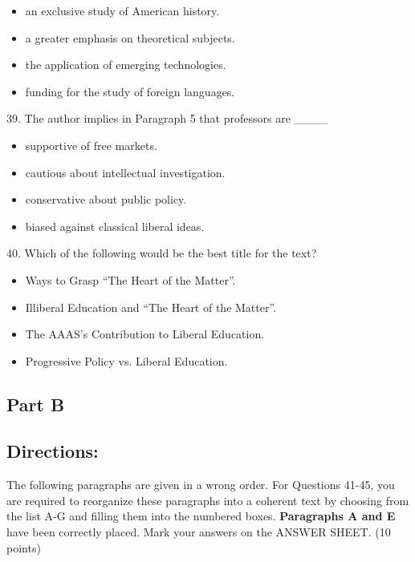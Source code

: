 \documentclass[UTF8,11pt]{ctexart}
\begin{document}
\begin{itemize}[leftmargin=2em,itemsep=.2em,topsep=.4em]\item[A.] an exclusive study of American history.
\item[B.] a greater emphasis on theoretical subjects.
\item[C.] the application of emerging technologies.
\item[D.] funding for the study of foreign languages.
\end{itemize}

39. The author implies in Paragraph 5 that professors are \_\_\_\_


\begin{itemize}[leftmargin=2em,itemsep=.2em,topsep=.4em]\item[A.] supportive of free markets.
\item[B.] cautious about intellectual investigation.
\item[C.] conservative about public policy.
\item[D.] biased against classical liberal ideas.
\end{itemize}

40. Which of the following would be the best title for the text?


\begin{itemize}[leftmargin=2em,itemsep=.2em,topsep=.4em]\item[A.] Ways to Grasp “The Heart of the Matter”.
\item[B.] Illiberal Education and “The Heart of the Matter”.
\item[C.] The AAAS’s Contribution to Liberal Education.
\item[D.] Progressive Policy vs. Liberal Education.
\end{itemize}

\subsection*{\textbf{Part B}}


\subsection*{\textbf{Directions:}}


The following paragraphs are given in a wrong order. For Questions 41-45, you are required to reorganize these paragraphs into a coherent text by choosing from the list A-G and filling them into the numbered boxes. \textbf{Paragraphs A and E} have been correctly placed. Mark your answers on the ANSWER SHEET. (10 points)
\end{document}
